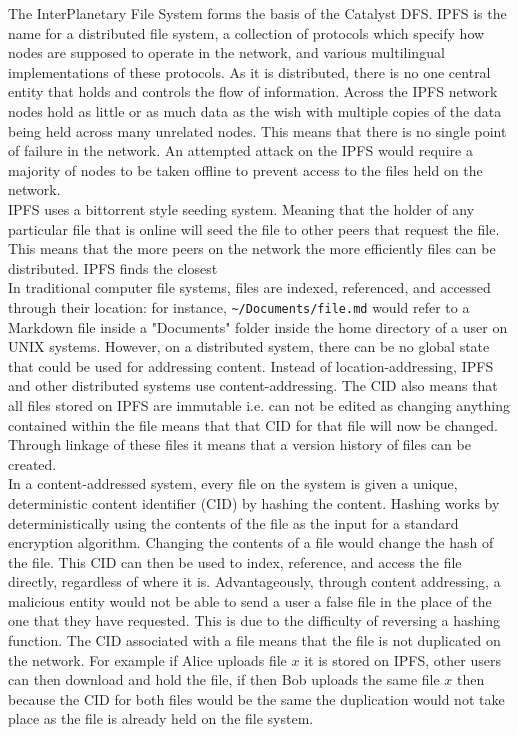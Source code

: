 The InterPlanetary File System forms the basis of the Catalyst DFS. IPFS is the name for a distributed file system, a collection of protocols which specify how nodes are supposed to operate in the network, and various multilingual implementations of these protocols. As it is distributed, there is no one central entity that holds and controls the flow of information. Across the IPFS network nodes hold as little or as much data as the wish with multiple copies of the data being held across many unrelated nodes. This means that there is no single point of failure in the network. An attempted attack on the IPFS would require a majority of nodes to be taken offline to prevent access to the files held on the network.   \\

IPFS uses a bittorrent style seeding system. Meaning that the holder of any particular file that is online will seed the file to other peers that request the file. This means that the more peers on the network the more efficiently files can be distributed. IPFS finds the closest \\

In traditional computer file systems, files are indexed, referenced, and accessed through their location: for instance, \verb`~/Documents/file.md` would refer to a Markdown file inside a "Documents" folder inside the home directory of a user on UNIX systems. However, on a distributed system, there can be no global state that could be used for addressing content. Instead of location-addressing, IPFS and other distributed systems use content-addressing. The CID also means that all files stored on IPFS are immutable i.e. can not be edited as changing anything contained within the file means that that CID for that file will now be changed. Through linkage of these files it means that a version history of files can be created. \\

In a content-addressed system, every file on the system is given a unique, deterministic content identifier (CID) by hashing the content. Hashing works by deterministically using the contents of the file as the input for a standard encryption algorithm. Changing the contents of a file would change the hash of the file. This CID can then be used to index, reference, and access the file directly, regardless of where it is. Advantageously, through content addressing, a malicious entity would not be able to send a user a false file in the place of the one that they have requested. This is due to the difficulty of reversing a hashing function. The CID associated with a file means that the file is not duplicated on the network. For example if Alice uploads file $x$ it is stored on IPFS, other users can then download and hold the file, if then Bob uploads the same file $x$ then because the CID for both files would be the same the duplication would not take place as the file is already held on the file system.  \\

